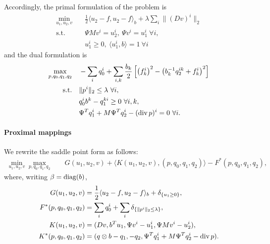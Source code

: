 Accordingly, the primal formulation of the problem is
\begin{align*}
    \min_{u_1,u_2,v} \quad
        & \frac{1}{2} \langle u_2 - f, u_2 - f \rangle_b 
            + \lambda \sum_{i} \| (D v)^{i} \|_{2} \\
    \text{s.t.}\quad 
        & \Psi M v^i = u_2^i, ~\Psi v^i = u_1^i ~\forall i, \\
        & u_1^i \geq 0, ~\langle u_1^i, b \rangle = 1 ~\forall i
\end{align*}
and the dual formulation is
\begin{align*}
    \max_{p,q_0,q_1,q_2} \quad
        & -\sum_i q_0^i+ \sum_{i,k} \frac{b_k}{2} \left [
                \left(f_k^i\right)^2
                - \left(b_k^{-1} q_2^{ik} + f_k^i\right)^2
            \right ] \\
    \text{s.t.}\quad 
        & \|p^{i}\|_{2} \leq \lambda ~\forall i, \\
        & q_0^i b^k - q_1^{ki} \geq 0 ~\forall i, k, \\
        & \Psi^T q_1^i + M \Psi^T q_2^i - (\operatorname{div} p)^i = 0 ~\forall i.
\end{align*}

\paragraph{Proximal mappings}

We rewrite the saddle point form as follows:
\begin{align*}
    \min_{u_1,u_2,v} \max_{p,q_0,q_1,q_2} \quad
        & G(u_1,u_2,v) + \langle K(u_1,u_2,v), (p,q_0,q_1,q_2) \rangle - F^*(p,q_0,q_1,q_2),
\end{align*}
where, writing $\beta = \operatorname{diag}(b)$,
\begin{align*}
    G(u_1,u_2,v) &= \frac{1}{2} \langle u_2-f, u_2-f \rangle_b
        + \delta_{\{u_1 \geq 0\}}, \\
    F^*(p,q_0,q_1,q_2) &= \sum_{i} q_0^i 
        + \sum_{i} \delta_{\{\|p^{i}\|_{2} \leq \lambda\}}, \\
    K(u_1,u_2,v) &= (
        Dv,
        b^T u_1,
        \Psi v^i - u_1^i,
        \Psi M v^i - u_2^i
    ), \\
    K^*(p,q_0,q_1,q_2) &= (
        q \otimes b - q_1,
        -q_2,
        \Psi^T q_1^i + M \Psi^T q_2^i - \operatorname{div}{p}
    ).
\end{align*}

